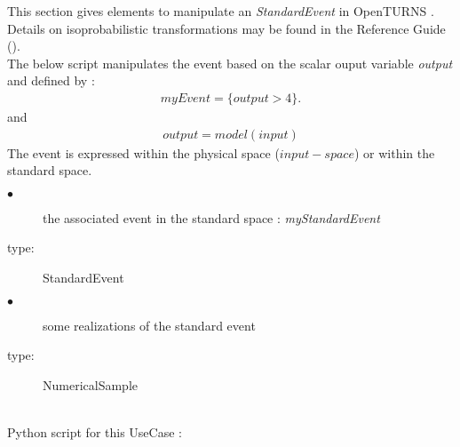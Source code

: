 \renewcommand{\filename}{docUC_ThresholdExceedance_StandardEventManipulation.tex}
\renewcommand{\filetitle}{UC : Manipulation of a StandardEvent}

\HeaderIIILevel


This section gives elements to manipulate an {\itshape StandardEvent} in OpenTURNS .\\

Details on isoprobabilistic transformations  may be found in the Reference Guide ().\\


The below script manipulates the event based on the scalar ouput variable  {\itshape output} and defined by :
\begin{align*}
  myEvent = \{ output > 4\}.
\end{align*}
and
\begin{align*}
  output = model(input)
\end{align*}
The event is expressed within the physical space ($input-space$) or within the standard space.

             {
               \begin{description}
               \item[$\bullet$] the associated event in the standard space : {\itshape myStandardEvent}
               \item[type:] StandardEvent
               \item[$\bullet$] some realizations of the standard event
               \item[type:] NumericalSample
               \end{description}
             }

             \textspace\\
             Python  script for this UseCase :

